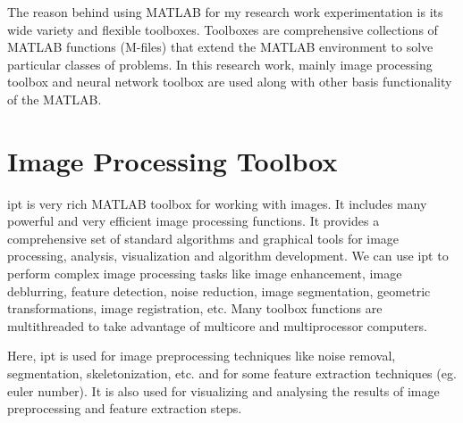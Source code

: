 The reason behind using MATLAB for my research work experimentation is its wide variety and flexible toolboxes. Toolboxes are comprehensive collections of MATLAB functions (M-files) that extend the MATLAB environment to solve particular classes of problems. In this research work, mainly image processing toolbox and neural network toolbox are used along with other basis functionality of the MATLAB.

\section{Image Processing Toolbox}
\ac{ipt} is very rich MATLAB toolbox for working with images. It includes many powerful and very efficient image processing functions. It provides a comprehensive set of standard algorithms and graphical tools for image processing, analysis, visualization and algorithm development. We can use \ac{ipt} to perform complex image processing tasks like image enhancement, image deblurring, feature detection, noise reduction, image segmentation, geometric transformations, image registration, etc. Many toolbox functions are multithreaded to take advantage of multicore and multiprocessor computers.\par
Here, \ac{ipt} is used for image preprocessing techniques like noise removal, segmentation, skeletonization, etc. and for some feature extraction techniques (eg. euler number). It is also used for visualizing and analysing the results of image preprocessing and feature extraction steps.


